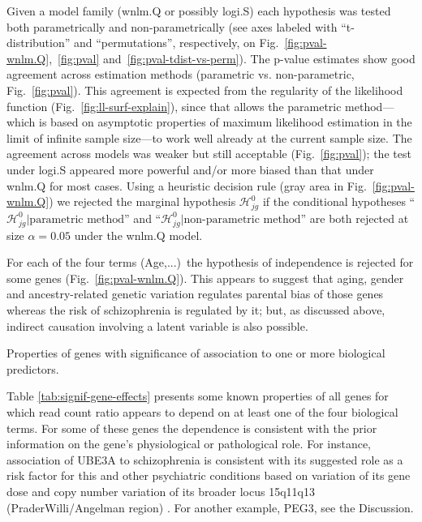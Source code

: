 \documentclass[letterpaper]{article}
\begin{document}
Given a model family (wnlm.Q or possibly logi.S) each hypothesis was tested
both parametrically and non-parametrically (see axes labeled with
``t-distribution'' and ``permutations'', respectively, on
Fig.~\ref{fig:pval-wnlm.Q},~\ref{fig:pval} and~\ref{fig:pval-tdist-vs-perm}).
The p-value estimates show good agreement across estimation methods
(parametric vs. non-parametric, Fig.~\ref{fig:pval}). This agreement is
expected from the regularity of the likelihood function
(Fig.~\ref{fig:ll-surf-explain}), since that allows the parametric
method---which is based on asymptotic properties of maximum likelihood
estimation in the limit of infinite sample size---to work well already at the
current sample size. The agreement across models was weaker but still
acceptable (Fig.~\ref{fig:pval}); the test under logi.S appeared more powerful
and/or more biased than that under wnlm.Q for most cases. Using a heuristic
decision rule (gray area in Fig.~\ref{fig:pval-wnlm.Q}) we rejected the
marginal hypothesis \(\mathcal{H}^0_{jg}\) if the conditional hypotheses
``\(\mathcal{H}^0_{jg} |\text{parametric method}\)'' and
``\(\mathcal{H}^0_{jg} |\text{non-parametric method}\)'' are both rejected at
size \(\alpha = 0.05\) under the wnlm.Q model.

For each of the four terms (Age,...)~the hypothesis of independence is
rejected for some genes (Fig.~\ref{fig:pval-wnlm.Q}). This appears to suggest
that aging, gender and ancestry-related genetic variation regulates parental
bias of those genes whereas the risk of schizophrenia is regulated by it; but,
as discussed above, indirect causation involving a latent variable is also
possible.

\begin{table}
\footnotesize

\caption{
Properties of genes with significance of association to one or more biological predictors.
}
\label{tab:signif-gene-effects}
\end{table}

Table \ref{tab:signif-gene-effects} presents some known properties of all
genes for which read count ratio appears to depend on at least one of the four
biological terms. For some of these genes the dependence is consistent with
the prior information on the gene's physiological or pathological role.  For
instance, association of UBE3A to schizophrenia is consistent with its
suggested role as a risk factor for this and other psychiatric conditions
based on variation of its gene dose and copy number variation of its broader
locus 15q11q13 (PraderWilli/Angelman region) \cite{Sullivan2012,
McNamara2013}.  For another example, PEG3, see the Discussion.
\end{document}
